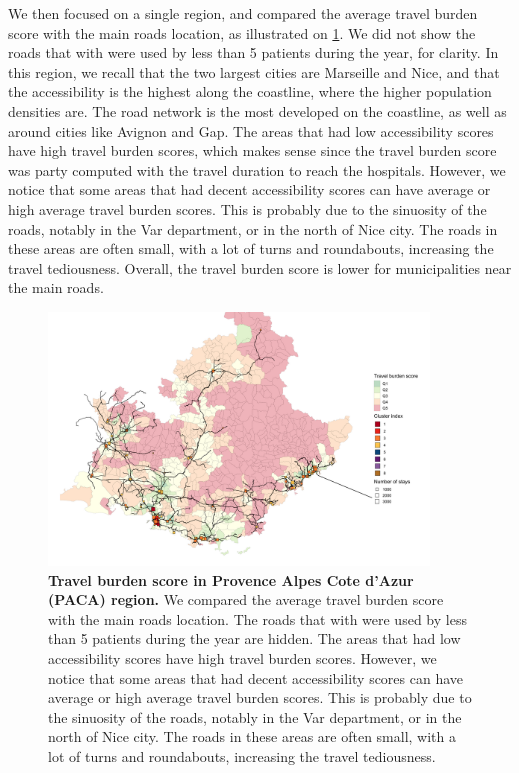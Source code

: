 We then focused on a single region, and compared the average travel burden score
with the main roads location, as illustrated on \cref{fig:travel-burden-paca}.
We did not show the roads that with were used by less than 5 patients during the
year, for clarity. In this region, we recall that the two largest cities are
Marseille and Nice, and that the accessibility is the highest along the
coastline, where the higher population densities are. The road network is the
most developed on the coastline, as well as around cities like Avignon and Gap.
The areas that had low accessibility scores have high travel burden scores,
which makes sense since the travel burden score was party computed with the
travel duration to reach the hospitals. However, we notice that some areas that
had decent accessibility scores can have average or high average travel burden
scores. This is probably due to the sinuosity of the roads, notably in the Var
department, or in the north of Nice city. The roads in these areas are often
small, with a lot of turns and roundabouts, increasing the travel tediousness.
Overall, the travel burden score is lower for municipalities near the main
roads.

\begin{figure}[h!]
    \includegraphics[width=0.9\textwidth]{images/routes/fig7.png}
    \centering
    \caption{
        \textbf{Travel burden score in Provence Alpes Cote d'Azur (PACA) region.}
        We compared the average travel burden score with the main roads
        location. The roads that with were used by less than 5 patients during
        the year are hidden. The areas that had low accessibility scores have
        high travel burden scores. However, we notice that some areas that had decent
        accessibility scores can have average or high average travel burden
        scores. This is probably due to the sinuosity of the roads, notably in
        the Var department, or in the north of Nice city. The roads in these
        areas are often small, with a lot of turns and roundabouts, increasing
        the travel tediousness. }
    \label{fig:travel-burden-paca}
\end{figure}

